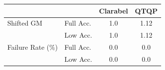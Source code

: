 \begin{tabular}{|l|l|c|c|}
  \hline
   &  & \textbf{Clarabel} & \textbf{QTQP} \\
  \hline
  Shifted GM & Full Acc. & 1.0 & 1.12 \\
   & Low Acc. & 1.0 & 1.12 \\
  Failure Rate (\%) & Full Acc. & 0.0 & 0.0 \\
   & Low Acc. & 0.0 & 0.0 \\
  \hline
\end{tabular}

